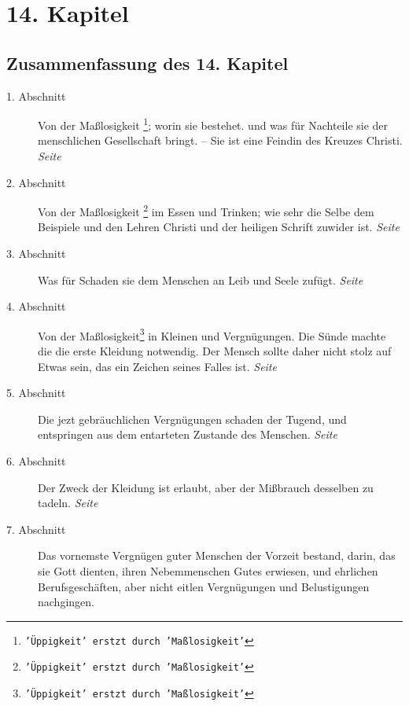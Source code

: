 
\chapter{14. Kapitel} \label{kap14}

\section{Zusammenfassung des 14. Kapitel}

\begin{description}
\item[1. Abschnitt] Von der Maßlosigkeit
\footnote{\texttt{'Üppigkeit' erstzt durch 'Maßlosigkeit'}};
worin sie bestehet. und was für Nachteile
sie der menschlichen Gesellschaft bringt. -- Sie ist eine Feindin des Kreuzes
Christi.
\dotfill \textit{Seite \pageref{kap14_ab1}}\\
\item[2. Abschnitt] Von der Maßlosigkeit
\footnote{\texttt{'Üppigkeit' erstzt durch 'Maßlosigkeit'}}
im Essen und Trinken; wie sehr die Selbe
dem Beispiele und den Lehren Christi und der heiligen Schrift zuwider ist.
\dotfill \textit{Seite \pageref{kap14_ab2}}\\
\item[3. Abschnitt] Was für Schaden sie dem Menschen an Leib und Seele zufügt.
\dotfill \textit{Seite \pageref{kap14_ab3}}\\
\item[4. Abschnitt] Von der Maßlosigkeit\footnote{\texttt{'Üppigkeit' erstzt durch 'Maßlosigkeit'}} in Kleinen und Vergnügungen. Die Sünde
machte die die erste Kleidung notwendig. Der Mensch sollte daher nicht stolz auf
Etwas sein, das ein Zeichen seines Falles ist.
\dotfill \textit{Seite \pageref{kap14_ab4}}\\
\item[5. Abschnitt] Die jezt gebräuchlichen Vergnügungen schaden der Tugend, und
entspringen aus dem entarteten Zustande des Menschen.
\dotfill \textit{Seite \pageref{kap14_ab5}}\\
\item[6. Abschnitt] Der Zweck der Kleidung ist erlaubt, aber der Mißbrauch
desselben zu tadeln.
\dotfill \textit{Seite \pageref{kap14_ab6}}\\
\item[7. Abschnitt] Das vornemste Vergnügen guter Menschen der Vorzeit bestand,
darin, das sie Gott dienten, ihren Nebemmenschen Gutes erwiesen, und ehrlichen
Berufsgeschäften, aber nicht eitlen Vergnügungen und Belustigungen nachgingen.

\end{description}
